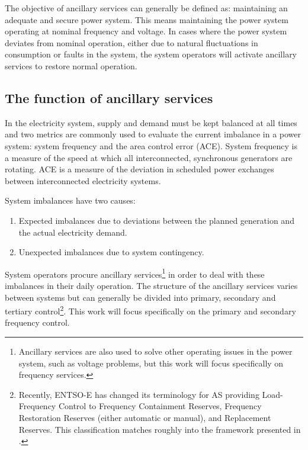 
The objective of ancillary services can generally be defined as: maintaining an adequate and secure power system. This means maintaining the power system operating at nominal frequency and voltage. In cases where the power system deviates from nominal operation, either due to natural fluctuations in consumption or faults in the system, the system operators will activate ancillary services to restore normal operation.


\subsection{The function of ancillary services}

In the electricity system, supply and demand must be kept balanced at all times and two metrics are commonly used to evaluate the current imbalance in a power system: system frequency and the area control error (ACE). System frequency is a measure of the speed at which all interconnected, synchronous generators are rotating.  ACE is a measure of the deviation in scheduled power exchanges between interconnected electricity systems. 

System imbalances have two causes:
\begin{enumerate}
\item Expected imbalances due to deviations between the planned generation and the actual electricity demand.
\item Unexpected imbalances due to system contingency.
\end{enumerate}

System operators procure ancillary services\footnote{Ancillary services are also used to solve other operating issues in the power system, such as voltage problems, but this work will focus specifically on frequency services.} in order to deal with these imbalances in their daily operation. The structure of the ancillary services varies between systems but can generally be divided into primary, secondary and tertiary control\footnote{Recently, ENTSO-E has changed its terminology for AS providing Load-Frequency Control to Frequency Containment Reserves, Frequency Restoration Reserves (either automatic or manual), and Replacement Reserves\cite{entsoe2013network}. This classification matches roughly into the framework presented in \cite{Rebours}.}\cite{Rebours}. This work will focus specifically on the primary and secondary frequency control.

